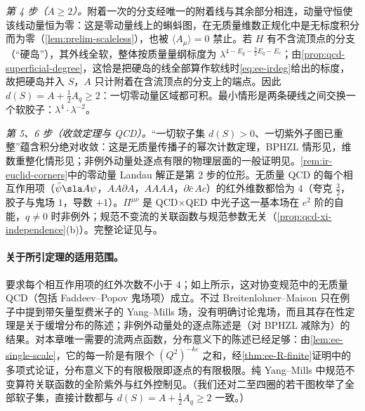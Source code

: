 \begin{proofsketch}
\emph{第 4 步（$A\ge2$）。}附着一次的分支经唯一的附着线与其余部分相连，动量守恒使该线动量恒为零：这是零动量线上的蝌蚪图，在无质量维数正规化中是无标度积分而为零（\cref{lem:prelim-scaleless}），也被 $\langle A_\mu\rangle=0$ 禁止。若 $H$ 有不含流顶点的分支（“硬岛”），其外线全软，整体按质量量纲标度为 $\lambda^{4-E_g-\frac32E_q-E_c}$；由\cref{prop:qcd-superficial-degree}，这恰是把硬岛的线全部算作软线时\cref{eq:ee-irdeg}给出的标度，故把硬岛并入 $S$，$A$ 只计附着在含流顶点的分支上的端点。因此 $d(S)=A+\frac12A_q\ge2$：一切零动量区域都可积。最小情形是两条硬线之间交换一个软胶子：$\lambda^4\cdot\lambda^{-2}$。

\emph{第 5、6 步（收敛定理与 QCD）。}“一切软子集 $d(S)>0$、一切紫外子图已重整”蕴含积分绝对收敛：这是无质量传播子的幂次计数定理，BPHZL 情形见\cite{LowensteinZimmermann1975,Lowenstein:1975ps}，维数重整化情形见\cite{Breitenlohner:1975hg,Breitenlohner:1976te}；非例外动量处逐点有限的物理层面的一般证明见\cite{PoggioQuinn1976}。\cref{rem:ir-euclid-corners}中的零动量 Landau 解正是第 2 步的位形。无质量 QCD 的每个相互作用项（$\bar\psi\sla A\psi$，$AA\partial A$，$AAAA$，$\partial\bar c\,Ac$）的红外维数都恰为 $4$（夸克 $\frac32$，胶子与鬼场 $1$，导数 $+1$）。$\Pi^{\mu\nu}$ 是 QCD$\times$QED 中光子这一基本场在 $e^2$ 阶的自能，$q\ne0$ 时非例外；规范不变流的关联函数与规范参数无关（\cref{prop:qcd-xi-independence}(b)）。完整论证见\cite{LowensteinZimmermann1975,Lowenstein:1975ps,Breitenlohner:1975hg,Breitenlohner:1976te}与\cite{PoggioQuinn1976}。
\end{proofsketch}

\paragraph{关于所引定理的适用范围。}\cite{Breitenlohner:1976te}要求每个相互作用项的红外次数不小于 $4$；如上所示，这对协变规范中的无质量 QCD（包括 Faddeev--Popov 鬼场项）成立。不过 Breitenlohner--Maison 只在例子中提到带矢量型费米子的 Yang--Mills 场，没有明确讨论鬼场，而且其存在性定理是关于缓增分布的陈述；非例外动量处的逐点陈述是\cite{PoggioQuinn1976}（对 BPHZL 减除为\cite{LowensteinZimmermann1975}）的结果。对本章唯一需要的流两点函数，分布意义下的陈述已经足够：由\cref{lem:ee-single-scale}，它的每一阶是有限个 $(Q^2)^{-k\varepsilon}$ 之和，经\cref{thm:ee-R-finite}证明中的多项式论证，分布意义下的有限极限即逐点的有限极限。纯 Yang--Mills 中规范不变算符关联函数的全阶紫外与红外控制见\cite{Frob:2015uqy}。（我们还对二至四圈的若干图枚举了全部软子集，直接计数都与 $d(S)=A+\frac12A_q\ge2$ 一致。）

